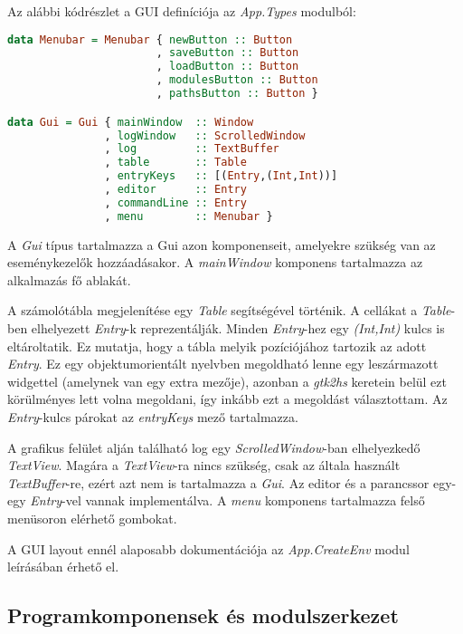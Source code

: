 Az alábbi kódrészlet a GUI definíciója az \textit{App.Types} modulból:

\begin{lstlisting}[language={Haskell}]
data Menubar = Menubar { newButton :: Button
                       , saveButton :: Button
                       , loadButton :: Button
                       , modulesButton :: Button
                       , pathsButton :: Button }

data Gui = Gui { mainWindow  :: Window
               , logWindow   :: ScrolledWindow
               , log         :: TextBuffer
               , table       :: Table
               , entryKeys   :: [(Entry,(Int,Int))]
               , editor      :: Entry
               , commandLine :: Entry
               , menu        :: Menubar }
\end{lstlisting}

A \textit{Gui} típus tartalmazza a Gui azon komponenseit, amelyekre szükség van az eseménykezelők hozzáadásakor. A \textit{mainWindow} komponens tartalmazza az alkalmazás fő ablakát. 

A számolótábla megjelenítése egy \textit{Table} segítségével történik. A cellákat a \textit{Table}-ben elhelyezett \textit{Entry}-k reprezentálják. Minden \textit{Entry}-hez egy \textit{(Int,Int)} kulcs is eltároltatik. Ez mutatja, hogy a tábla melyik pozíciójához tartozik az adott \textit{Entry}. Ez egy objektumorientált nyelvben megoldható lenne egy leszármazott widgettel (amelynek van egy extra mezője), azonban a \textit{gtk2hs} keretein belül ezt körülményes lett volna megoldani, így inkább ezt a megoldást választottam. Az \textit{Entry}-kulcs párokat az \textit{entryKeys} mező tartalmazza.

A grafikus felület alján található log egy \textit{ScrolledWindow}-ban elhelyezkedő \textit{TextView}. Magára a \textit{TextView}-ra nincs szükség, csak az általa használt \textit{TextBuffer}-re, ezért azt nem is tartalmazza a \textit{Gui}. Az editor és a parancssor egy-egy \textit{Entry}-vel vannak implementálva. A \textit{menu} komponens tartalmazza felső menüsoron elérhető gombokat. 

A GUI layout ennél alaposabb dokumentációja az \textit{App.CreateEnv} modul leírásában érhető el. 

\subsection{Programkomponensek és modulszerkezet}


